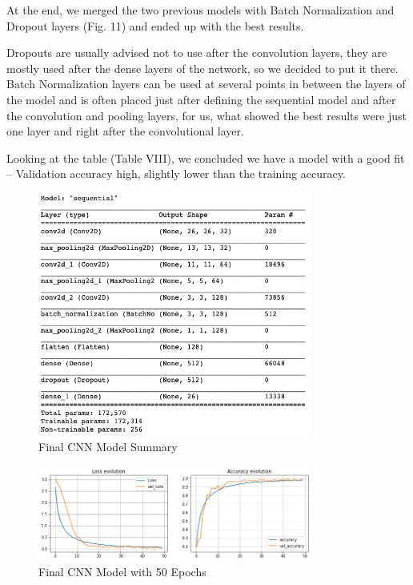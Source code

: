 \documentclass[conference]{IEEEtran}
\begin{document}
At the end, we merged the two previous models with Batch Normalization and Dropout layers (Fig. 11) and ended up with the best results.

Dropouts are usually advised not to use after the convolution layers, they are mostly used after the dense layers of the network, so we decided to put it there. Batch Normalization layers can be used at several points in between the layers of the model and is often placed just after defining the sequential model and after the convolution and pooling layers, for us, what showed the best results were just one layer and right after the convolutional layer.

Looking at the table (Table VIII), we concluded we have a model with a good fit – Validation accuracy high, slightly lower than the training accuracy.

\begin{figure}[htbp]
    \centerline{\includegraphics[width=9cm]{img/final_model_summary.png}}
    \caption{Final CNN Model Summary}
    \label{fig:hist_train_classes}
\end{figure}

\begin{figure}[htbp]
    \centerline{\includegraphics[width=9cm]{img/final_model_50ep.png}}
    \caption{Final CNN Model with 50 Epochs}
    \label{fig:hist_train_classes}
\end{figure}
\end{document}
